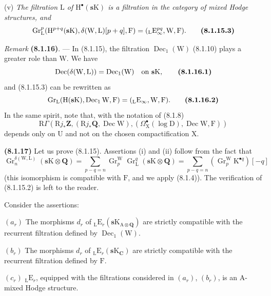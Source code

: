 \documentclass[11pt,leqno]{article}
\begin{document}
(v) \textit{The filtration \(\mathrm{L}\) of \(\mathrm{H}^{\bullet}(\mathbf{s}\mathrm{K})\) is a filtration in the category of mixed Hodge structures, and}
\[
\operatorname{Gr}_{\mathrm{L}}^{p}
(\mathrm{H}^{p+q}(\mathbf{s}\mathrm{K}),
\delta(\mathrm{W},\mathrm{L})[p+q],\mathrm{F})
=
({}_{\mathrm{L}}\mathrm{E}_{\infty}^{pq},\mathrm{W},\mathrm{F}).
\tag*{\textbf{(8.1.15.3)}}
\]

\textit{Remark} \textbf{(8.1.16)}. — In (8.1.15), the filtration \(\operatorname{Dec}_{1}(\mathrm{W})\) (8.1.10) plays a greater role than \(\mathrm{W}\). We have
\[
\operatorname{Dec}(\delta(\mathrm{W},\mathrm{L}))
=
\operatorname{Dec}_{1}(\mathrm{W})
\quad\text{on }\mathbf{s}\mathrm{K},
\tag*{\textbf{(8.1.16.1)}}
\]
and (8.1.15.3) can be rewritten as
\[
\operatorname{Gr}_{\mathrm{L}}
(\mathrm{H}(\mathbf{s}\mathrm{K}),\operatorname{Dec}_{1}\mathrm{W},\mathrm{F})
=
({}_{\mathrm{L}}\mathrm{E}_{\infty},\mathrm{W},\mathrm{F}).
\tag*{\textbf{(8.1.16.2)}}
\]
In the same spirit, note that, with the notation of (8.1.8)
\[
\mathrm{R}\Gamma
(\mathrm{R}j_{\ast}\mathbf{Z},
(\mathrm{R}j_{\ast}\mathbf{Q},\operatorname{Dec}\mathrm{W}),
(\Omega_{\mathrm{X}}^\bullet(\log\mathrm{D}),
\operatorname{Dec}\mathrm{W},\mathrm{F}))
\]
depends only on \(\mathrm{U}\) and not on the chosen compactification \(\mathrm{X}\).

\textbf{(8.1.17)} Let us prove (8.1.15). Assertions (i) and (ii) follow from the fact that
\[
\operatorname{Gr}_{n}^{\delta(\mathrm{W},\mathrm{L})}
(\mathbf{s}\mathrm{K}\otimes\mathbf{Q})
=
\sum_{p-q=n}
\operatorname{Gr}_{p}^{\mathrm{W}}\operatorname{Gr}_{\mathrm{L}}^{q}
(\mathbf{s}\mathrm{K}\otimes\mathbf{Q})
=
\sum_{p-q=n}
(\operatorname{Gr}_{p}^{\mathrm{W}}\mathrm{K}^{\bullet q})[-q]
\]
(this isomorphism is compatible with \(\mathrm{F}\), and we apply (8.1.4)). The verification of (8.1.15.2) is left to the reader.

Consider the assertions:

\((a_{r})\) The morphisms \(d_{r}\) of \({}_{\mathrm{L}}\mathrm{E}_{r}(\mathbf{s}\mathrm{K}_{\mathrm{A}\otimes\mathbf{Q}})\) are strictly compatible with the recurrent filtration defined by \(\operatorname{Dec}_{1}(\mathrm{W})\).

\((b_{r})\) The morphisms \(d_{r}\) of \({}_{\mathrm{L}}\mathrm{E}_{r}(\mathbf{s}\mathrm{K}_{\mathbf{C}})\) are strictly compatible with the recurrent filtration defined by \(\mathrm{F}\).

\((c_{r})\) \({}_{\mathrm{L}}\mathrm{E}_{r}\), equipped with the filtrations considered in \((a_{r})\), \((b_{r})\), is an \(\mathrm{A}\)-mixed Hodge structure.
\end{document}
